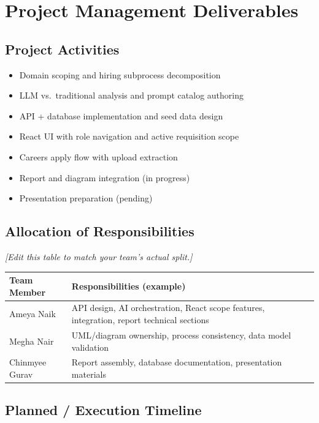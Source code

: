 \documentclass[12pt]{article}
\begin{document}
\section{Project Management Deliverables}
\label{sec:pm}

\subsection{Project Activities}

\begin{itemize}
    \item Domain scoping and hiring subprocess decomposition
    \item LLM vs.\ traditional analysis and prompt catalog authoring
    \item API + database implementation and seed data design
    \item React UI with role navigation and active requisition scope
    \item Careers apply flow with upload extraction
    \item Report and diagram integration (in progress)
    \item Presentation preparation (pending)
\end{itemize}

\subsection{Allocation of Responsibilities}

\textit{[Edit this table to match your team's actual split.]}

\begin{longtable}{|p{3.5cm}|p{12.5cm}|}
\hline
\textbf{Team Member} & \textbf{Responsibilities (example)} \\
\hline
Ameya Naik & API design, AI orchestration, React scope features, integration, report technical sections \\
\hline
Megha Nair & UML/diagram ownership, process consistency, data model validation \\
\hline
Chinmyee Gurav & Report assembly, database documentation, presentation materials \\
\hline
\end{longtable}

\subsection{Planned / Execution Timeline}
\end{document}
